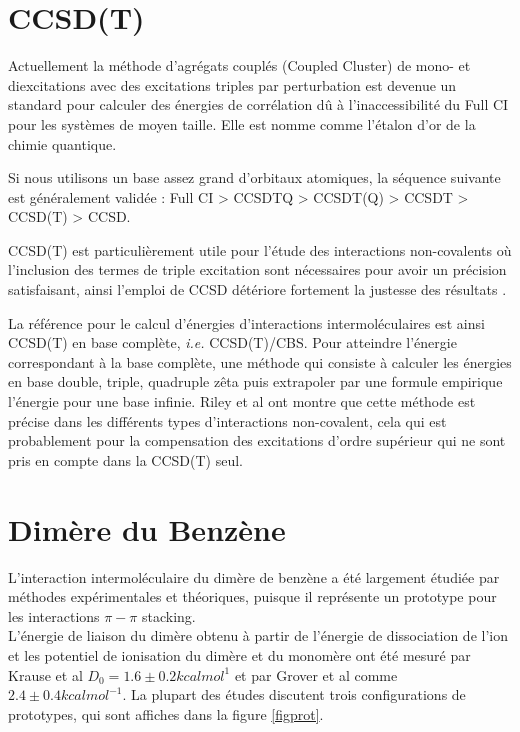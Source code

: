  \section{CCSD(T)}
 
 Actuellement la méthode d’agrégats couplés (Coupled Cluster) de mono- et
 diexcitations avec des excitations triples par perturbation est devenue un standard
 pour calculer des énergies de corrélation dû à l'inaccessibilité du Full CI pour les systèmes de moyen taille. Elle est nomme comme l'étalon d'or de la chimie quantique. 
 
 Si nous utilisons un base assez grand d'orbitaux atomiques, la séquence suivante est généralement validée : Full CI > CCSDTQ > CCSDT(Q) > CCSDT > CCSD(T) > CCSD.
 
 CCSD(T) est particulièrement utile pour l'étude des interactions non-covalents où l'inclusion des termes de triple excitation sont nécessaires pour avoir un précision satisfaisant, ainsi l'emploi de CCSD détériore fortement la justesse des résultats \cite{r2012ccsd}.
 
 La référence pour le calcul d’énergies d’interactions intermoléculaires est ainsi
 CCSD(T) en base complète, \textit{i.e.} CCSD(T)/CBS. Pour atteindre l’énergie correspondant à la base complète, une méthode qui consiste à calculer les énergies en base double, triple,
 quadruple zêta puis extrapoler par une formule empirique l’énergie pour une base infinie. Riley et al \cite{riley2010stabilization} ont montre que cette méthode est précise dans les différents types d'interactions non-covalent, cela qui est probablement pour la compensation des excitations d'ordre supérieur qui ne sont pris en compte dans la CCSD(T) seul.  
 
 
 \section{Dimère du Benzène}
 
 L'interaction intermoléculaire du dimère de benzène a été largement étudiée par méthodes  expérimentales et théoriques, puisque il représente un prototype pour les interactions $\pi-\pi$ stacking.\\
 
 L'énergie de liaison du dimère obtenu à partir de l'énergie de dissociation de l'ion et les potentiel de ionisation du dimère et du monomère ont été mesuré par Krause et al \cite{krause1991binding} $D_{0}= 1.6 \pm 0.2 kcal mol^{1}$ et par Grover et al \cite{grover1987dissociation} comme $2.4 \pm 0.4 kcal mol^{-1}$. La plupart des études discutent trois configurations de prototypes, qui sont affiches dans la figure \ref{figprot}.
 
